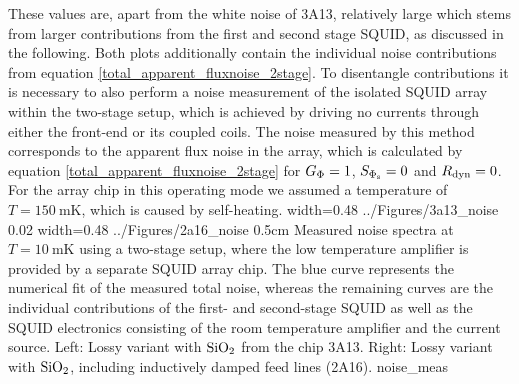 These values are, apart from the white noise of 3A13, relatively large which stems from larger contributions from the first and second stage SQUID, as discussed in the following. Both plots additionally contain the individual noise contributions from equation \ref{total_apparent_fluxnoise_2stage}. To disentangle contributions it is necessary to also perform a noise measurement of the isolated SQUID array within the two-stage setup, which is achieved by driving no currents through either the front-end or its coupled coils. The noise measured by this method corresponds to the apparent flux noise in the array, which is calculated by equation  \ref{total_apparent_fluxnoise_2stage} for $G_{\rm \Phi}=1$, $S_{\rm \Phi_s}=0$ and $R_{\rm dyn}=0$. For the array chip in this operating mode we assumed a temperature of $T=\qty{150}{\milli\kelvin}$, which is caused by self-heating.
{width=0.48\textwidth}
{../Figures/3a13_noise}
{0.02\textwidth} %
{width=0.48\textwidth}
{../Figures/2a16_noise}
{0.5cm} %
{Measured noise spectra at $T=\qty{10}{\milli\kelvin}$ using a two-stage setup, where the low temperature amplifier is provided by a separate SQUID array chip. The blue curve represents the numerical fit of the measured total noise, whereas the remaining curves are the individual contributions of the first- and second-stage SQUID as well as the SQUID electronics consisting of the room temperature amplifier and the current source. Left: Lossy variant with ${\rm SiO_2}$ from the chip 3A13. Right: Lossy variant with ${\rm SiO_2}$, including inductively damped feed lines (2A16).}
{noise_meas}
